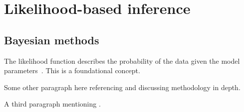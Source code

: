 \section{Likelihood-based inference}
\subsection{Bayesian methods}

The likelihood function describes the probability of the data given the
model parameters~\cite{2024JCAP...03..035A}. This is a foundational concept.

Some other paragraph here referencing \cite{NoArxiv2020} and discussing
methodology in depth.

A third paragraph mentioning \cite{StubKey, OtherKey}.
